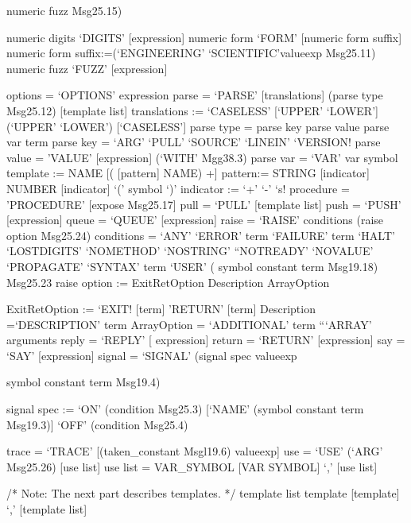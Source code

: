 numeric fuzz \textbar{} Msg25.15)

numeric digits `DIGITS' {[}expression{]} numeric form `FORM' {[}numeric
form suffix{]} numeric form suffix:=(`ENGINEERING'
\textbar{}`SCIENTIFIC'\textbar valueexp \textbar{} Msg25.11) numeric
fuzz `FUZZ' {[}expression{]}

options = `OPTIONS' expression parse = `PARSE' {[}translations{]} (parse
type \textbar Msg25.12) {[}template list{]} translations := `CASELESS'
{[}`UPPER' \textbar{} `LOWER'{]} \textbar{} (`UPPER' \textbar{} `LOWER')
{[}`CASELESS'{]} parse type = parse key \textbar{} parse value
\textbar{} parse var \textbar{} term parse key = `ARG' \textbar{} `PULL'
\textbar{} `SOURCE' \textbar{} `LINEIN' \textbar{} `VERSION! parse value
= 'VALUE' {[}expression{]} (`WITH' \textbar{} Mgg38.3) parse var = `VAR'
var symbol template := NAME {[}( {[}pattern{]} NAME) +{]} pattern:=
STRING \textbar{} {[}indicator{]} NUMBER \textbar{} {[}indicator{]} `('
symbol `)' indicator := `+' \textbar{} `-' \textbar{} `s! procedure =
'PROCEDURE' {[}expose \textbar{} Msg25.17{]} pull = `PULL' {[}template
list{]} push = `PUSH' {[}expression{]} queue = `QUEUE' {[}expression{]}
raise = `RAISE' conditions (raise option \textbar{} Msg25.24) conditions
= `ANY' \textbar{} `ERROR' term \textbar{} `FAILURE' term \textbar{}
`HALT'\textbar{} `LOSTDIGITS' \textbar{} `NOMETHOD' \textbar{}
`NOSTRING' \textbar{} ``NOTREADY' \textbar{} `NOVALUE' \textbar{}
`PROPAGATE' \textbar{} `SYNTAX' term \textbar{} `USER' ( symbol constant
term \textbar{} Msg19.18) \textbar{} Msg25.23 raise option :=
ExitRetOption \textbar{} Description \textbar{} ArrayOption

ExitRetOption := `EXIT! {[}term{]} \textbar{} 'RETURN' {[}term{]}
Description =`DESCRIPTION' term ArrayOption = `ADDITIONAL' term
\textbar{} ```ARRAY' arguments reply = `REPLY' {[} expression{]} return
= `RETURN' {[}expression{]} say = `SAY' {[}expression{]} signal =
`SIGNAL' (signal spec \textbar{} valueexp

symbol constant term \textbar{} Msg19.4)

signal spec := `ON' (condition \textbar{} Msg25.3) {[}`NAME' (symbol
constant term \textbar{} Msg19.3){]} \textbar{} `OFF' (condition
\textbar{} Msg25.4)

trace = `TRACE' {[}(taken\_constant \textbar{} Msgl19.6) \textbar{}
valueexp{]} use = `USE' (`ARG' \textbar{} Msg25.26) {[}use list{]} use
list = VAR\_SYMBOL \textbar{} {[}VAR SYMBOL{]} `,' {[}use list{]}

/* Note: The next part describes templates. */ template list template
\textbar{} {[}template{]} `,' {[}template list{]}

